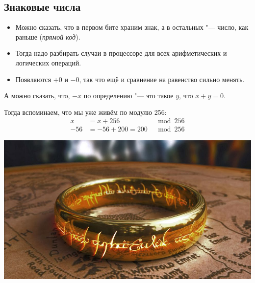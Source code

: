 \subsection{Знаковые числа}

\begin{frame}
\end{frame}

\begin{frame}
	\begin{itemize}
		\item
			Можно сказать, что в первом бите храним знак, а в остальных "--- число, как раньше (\textit{прямой код}).
		\item
			Тогда надо разбирать случаи в процессоре для всех арифметических и логических операций.
		\item
			Появляются $+0$ и $-0$, так что ещё и сравнение на равенство сильно менять.
	\end{itemize}

	А можно сказать, что, $-x$ по определению "--- это такое $y$, что $x+y=0$.

	Тогда вспоминаем, что мы уже живём по модулю 256:
	\begin{align*}
		x &= x + 256 &\mod 256 \\
		-56 &= -56 + 200 = 200 &\mod 256
	\end{align*}
\end{frame}

\begin{frame}
	\begin{center}
		\includegraphics[scale=0.3]{one-ring-to-rule.jpg}
	\end{center}
\end{frame}

